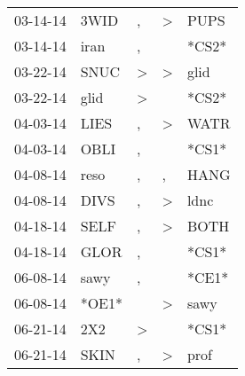 \begin{supertabular}{p{0.07\textwidth}p{0.06\textwidth}p{0.02\textwidth}p{0.02\textwidth}p{0.06\textwidth}}
          03-14-14\textsuperscript{} &           3WID\textsuperscript{} &                , &     \textgreater &           PUPS\textsuperscript{} \\
          03-14-14\textsuperscript{} &           iran\textsuperscript{} &                , &                  &                            *CS2* \\
          03-22-14\textsuperscript{} &           SNUC\textsuperscript{} &     \textgreater &     \textgreater &           glid\textsuperscript{} \\
          03-22-14\textsuperscript{} &           glid\textsuperscript{} &     \textgreater &                  &                            *CS2* \\
          04-03-14\textsuperscript{} &           LIES\textsuperscript{} &                , &     \textgreater &           WATR\textsuperscript{} \\
          04-03-14\textsuperscript{} &           OBLI\textsuperscript{} &                , &                  &                            *CS1* \\
          04-08-14\textsuperscript{} &           reso\textsuperscript{} &                , &                , &           HANG\textsuperscript{} \\
          04-08-14\textsuperscript{} &           DIVS\textsuperscript{} &                , &     \textgreater &           ldnc\textsuperscript{} \\
          04-18-14\textsuperscript{} &           SELF\textsuperscript{} &                , &     \textgreater &           BOTH\textsuperscript{} \\
          04-18-14\textsuperscript{} &           GLOR\textsuperscript{} &                , &                  &                            *CS1* \\
          06-08-14\textsuperscript{} &           sawy\textsuperscript{} &                , &                  &                            *CE1* \\
          06-08-14\textsuperscript{} &                            *OE1* &                  &     \textgreater &           sawy\textsuperscript{} \\
          06-21-14\textsuperscript{} &            2X2\textsuperscript{} &     \textgreater &                  &                            *CS1* \\
          06-21-14\textsuperscript{} &           SKIN\textsuperscript{} &                , &     \textgreater &           prof\textsuperscript{} \\

\end{supertabular}
